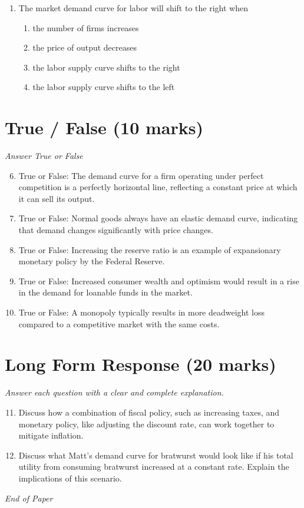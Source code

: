\documentclass[12pt]{article}
\begin{document}
\begin{enumerate}[label=\arabic*.]
\begin{enumerate}[label=(\alph*)]
    \item depreciate.
    \item remain unchanged.
    \item change indeterminately.
\end{enumerate}
\item The market demand curve for labor will shift to the right when
\begin{enumerate}[label=(\alph*)]
    \item the number of firms increases
    \item the price of output decreases
    \item the labor supply curve shifts to the right
    \item the labor supply curve shifts to the left
\end{enumerate}
\end{enumerate}

\section*{True / False (10 marks)}
\textit{Answer True or False}
\begin{enumerate}[label=\arabic*.]
\setcounter{enumi}{5}
\item True or False: The demand curve for a firm operating under perfect competition is a perfectly horizontal line, reflecting a constant price at which it can sell its output.
\item True or False: Normal goods always have an elastic demand curve, indicating that demand changes significantly with price changes.
\item True or False: Increasing the reserve ratio is an example of expansionary monetary policy by the Federal Reserve.
\item True or False: Increased consumer wealth and optimism would result in a rise in the demand for loanable funds in the market.
\item True or False: A monopoly typically results in more deadweight loss compared to a competitive market with the same costs.
\end{enumerate}

\section*{Long Form Response (20 marks)}
\textit{Answer each question with a clear and complete explanation.}
\begin{enumerate}[label=\arabic*.]
\setcounter{enumi}{10}
\item Discuss how a combination of fiscal policy, such as increasing taxes, and monetary policy, like adjusting the discount rate, can work together to mitigate inflation.
\item Discuss what Matt's demand curve for bratwurst would look like if his total utility from consuming bratwurst increased at a constant rate. Explain the implications of this scenario.
\end{enumerate}

\vfill
\noindent\textit{End of Paper}
\end{document}

